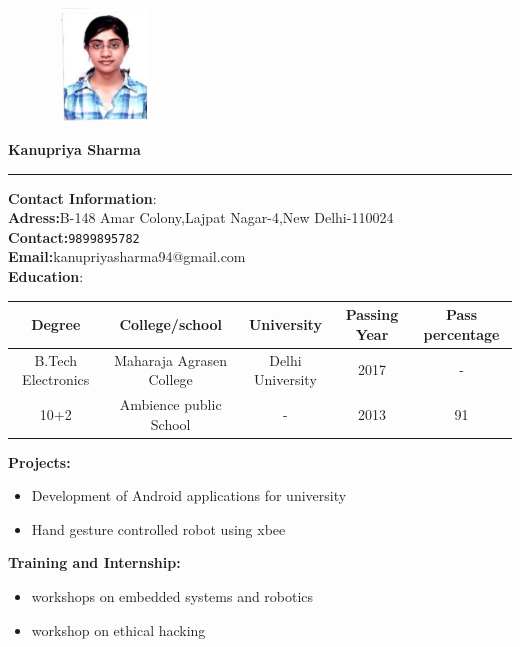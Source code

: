 \documentclass[10pt,a4paper]{article}
\begin{document}
	
\begin{figure}
\includegraphics[width=3cm, height=3cm]{Untitled}
\end{figure}

\textbf{\huge \bigskip Kanupriya Sharma}
\hrule
\large
\begin{flushleft}
	
	
	\textbf{Contact Information}:\\
	\textbf{Adress:}B-148 Amar Colony,Lajpat Nagar-4,New Delhi-110024\\
	\textbf{Contact:}\texttt{9899895782}\\
	\textbf{Email:}kanupriyasharma94@gmail.com\\ 
	\textbf{\bigskip  Education}:\\
	
   \begin{tabular}{|c|c|c|c|c|}
   	\hline \textbf{ Degree}  & \textbf{College/school}  & \textbf{University} & \textbf{Passing Year} & \textbf{ Pass percentage} \\ 
   	\hline B.Tech Electronics & Maharaja Agrasen College  & Delhi University & 2017 & - \\ 
   	\hline 
10+2 & Ambience public School & - & 2013 & 91 \\
    \hline

\end{tabular} 
\bigskip

   \textbf{Projects:}\\
      \begin{itemize}
      	\item  Development of Android applications for university
      	\item  Hand gesture controlled robot using xbee
      \end{itemize}
  

  
  \textbf{Training and Internship:}\\
   \begin{itemize}
   	\item  workshops on embedded systems and robotics\\
   	\item  workshop on ethical hacking\\
   \end{itemize}
  

\end{flushleft}
\end{document}
